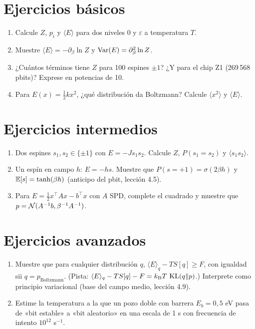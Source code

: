 \documentclass[11pt,a4paper]{article}
\begin{document}

\section{Ejercicios básicos}
\begin{enumerate}[label=\textbf{B\arabic*.}]
\item Calcule $Z$, $p_i$ y $\langle E\rangle$ para dos niveles $0$ y $\varepsilon$ a temperatura $T$.
\item Muestre $\langle E\rangle=-\partial_\beta\ln Z$ y $\operatorname{Var}(E)=\partial_\beta^2\ln Z$.
\item ¿Cuántos términos tiene $Z$ para 100 espines $\pm1$? ¿Y para el chip Z1 (269\,568 pbits)? Exprese en potencias de 10.
\item Para $E(x)=\frac12kx^2$, ¿qué distribución da Boltzmann? Calcule $\langle x^2\rangle$ y $\langle E\rangle$.
\end{enumerate}

\section{Ejercicios intermedios}
\begin{enumerate}[label=\textbf{I\arabic*.}]
\item Dos espines $s_1,s_2\in\{\pm1\}$ con $E=-Js_1s_2$. Calcule $Z$, $P(s_1=s_2)$ y $\langle s_1s_2\rangle$.
\item Un espín en campo $h$: $E=-hs$. Muestre que $P(s=+1)=\sigma(2\beta h)$ y $\mathbb{E}[s]=\tanh(\beta h)$ (anticipo del pbit, lección 4.5).
\item Para $E=\frac12x^\top Ax-b^\top x$ con $A$ SPD, complete el cuadrado y muestre que $p=\mathcal{N}(A^{-1}b,\beta^{-1}A^{-1})$.
\end{enumerate}

\section{Ejercicios avanzados}
\begin{enumerate}[label=\textbf{A\arabic*.}]
\item Muestre que para cualquier distribución $q$, $\langle E\rangle_q-TS[q]\ge F$, con igualdad sii $q=p_{\text{Boltzmann}}$. (Pista: $\langle E\rangle_q-TS[q]-F=k_{\mathrm B} T\,\operatorname{KL}(q\|p)$.) Interprete como principio variacional (base del campo medio, lección 4.9).
\item Estime la temperatura a la que un pozo doble con barrera $E_b=0{,}5$ eV pasa de «bit estable» a «bit aleatorio» en una escala de 1 s con frecuencia de intento $10^{12}$ s$^{-1}$.
\end{enumerate}
\end{document}
